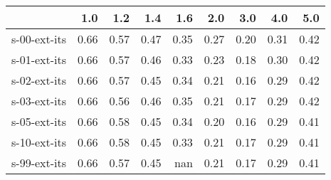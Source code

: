 \begin{tabular}{lrrrrrrrr}
\toprule
{} &  1.0 &  1.2 &  1.4 &  1.6 &  2.0 &  3.0 &  4.0 &  5.0 \\
\midrule
s-00-ext-its & 0.66 & 0.57 & 0.47 & 0.35 & 0.27 & 0.20 & 0.31 & 0.42 \\
s-01-ext-its & 0.66 & 0.57 & 0.46 & 0.33 & 0.23 & 0.18 & 0.30 & 0.42 \\
s-02-ext-its & 0.66 & 0.57 & 0.45 & 0.34 & 0.21 & 0.16 & 0.29 & 0.42 \\
s-03-ext-its & 0.66 & 0.56 & 0.46 & 0.35 & 0.21 & 0.17 & 0.29 & 0.42 \\
s-05-ext-its & 0.66 & 0.58 & 0.45 & 0.34 & 0.20 & 0.16 & 0.29 & 0.41 \\
s-10-ext-its & 0.66 & 0.58 & 0.45 & 0.33 & 0.21 & 0.17 & 0.29 & 0.41 \\
s-99-ext-its & 0.66 & 0.57 & 0.45 &  nan & 0.21 & 0.17 & 0.29 & 0.41 \\
\bottomrule
\end{tabular}
